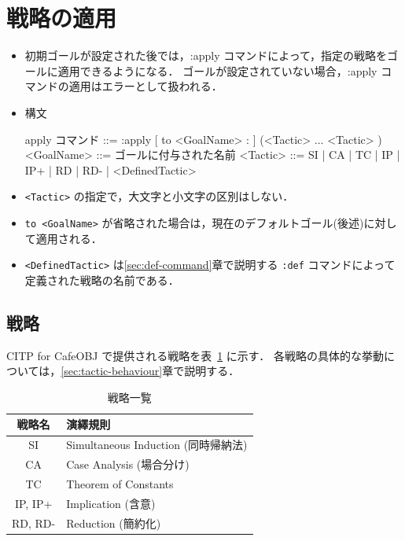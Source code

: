 \documentclass[a4paper,oneside,10pt,here]{memoir}
\newenvironment{vvtm}%
{\parskip=0pt\lineskip=0pt\begin{center}\begin{minipage}{0.8\textwidth}\begin{snugshade}}%
  {\end{snugshade}\end{minipage}\end{center}}
\begin{document}
\section{戦略の適用}\label{sec:apply}

\begin{itemize}
\item 初期ゴールが設定された後では，:apply コマンドによって，指定の戦略をゴールに適用できるようになる．
  ゴールが設定されていない場合，:apply コマンドの適用はエラーとして扱われる．
\item 構文
  \begin{vvtm}
    \begin{simplev}
    apply コマンド ::= :apply [ to <GoalName> : ] (<Tactic> ... <Tactic> )
    <GoalName>     ::= ゴールに付与された名前
    <Tactic>       ::= SI | CA | TC | IP | IP+ | RD | RD- | <DefinedTactic>
    \end{simplev}
  \end{vvtm}

\item \verb|<Tactic>| の指定で，大文字と小文字の区別はしない．
\item \verb|to <GoalName>| が省略された場合は，現在のデフォルトゴール(後述)に対して適用される．
\item \verb|<DefinedTactic>| は\ref{sec:def-command}章で説明する \verb|:def| コマンドによって定義された戦略の名前である．
\end{itemize}

\subsection{戦略}\label{sec:predefined-tactics}
CITP for CafeOBJ で提供される戦略を表~\ref{tab:tactics} に示す．
各戦略の具体的な挙動については，\ref{sec:tactic-behaviour}章で説明する．

\begin{table}
\label{tab:tactics}
\caption{戦略一覧}
\begin{center}
\begin{tabular}[htbp]{|c|l|}\hline
戦略名 & 演繹規則 \\\hline\hline
SI & Simultaneous Induction (同時帰納法) \\\hline
CA & Case Analysis (場合分け)\\\hline
TC & Theorem of Constants  \\\hline
IP, IP+ & Implication (含意)\\\hline
RD, RD- & Reduction (簡約化) \\\hline
\end{tabular}
\end{center}
\end{table}
\end{document}
